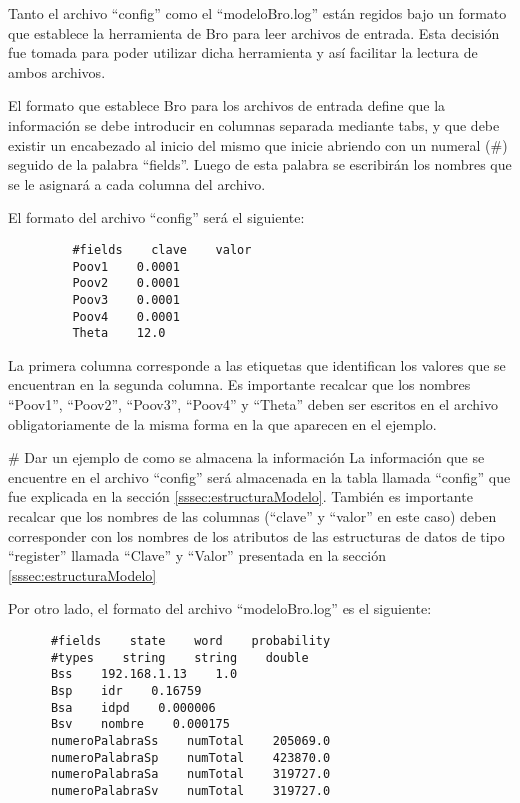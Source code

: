 Tanto el archivo “config” como el “modeloBro.log” están regidos bajo un formato que establece la herramienta de Bro para leer archivos de entrada. Esta decisión fue tomada para poder utilizar dicha herramienta y así facilitar la lectura de ambos archivos.

El formato que establece Bro para los archivos de entrada define que la información se debe introducir en columnas separada mediante tabs, y que debe existir un encabezado al inicio del mismo que inicie abriendo con un numeral (\#) seguido de la palabra “fields”. Luego de esta palabra se escribirán los nombres que se le asignará a cada columna del archivo.

El formato del archivo “config” será el siguiente:

\begin{verbatim}
         #fields    clave    valor
         Poov1    0.0001
         Poov2    0.0001
         Poov3    0.0001
         Poov4    0.0001
         Theta    12.0
\end{verbatim}

La primera columna corresponde a las etiquetas que identifican los valores que se encuentran en la segunda columna. Es importante recalcar que los nombres “Poov1”, “Poov2”, “Poov3”, “Poov4” y “Theta” deben ser escritos en el archivo obligatoriamente de la misma forma en la que aparecen en el ejemplo.

\# Dar un ejemplo de como se almacena la información
La información que se encuentre en el archivo “config” será almacenada en  la tabla llamada “config” que fue explicada en la sección \ref{sssec:estructuraModelo}. También es importante recalcar que los nombres de las columnas (“clave” y “valor” en este caso) deben corresponder con los nombres de los atributos de las estructuras de datos de tipo “register” llamada “Clave” y “Valor” presentada en la sección \ref{sssec:estructuraModelo}

Por otro lado, el formato del archivo “modeloBro.log” es el siguiente:

\begin{verbatim}
      #fields    state    word    probability
      #types    string    string    double
      Bss    192.168.1.13    1.0
      Bsp    idr    0.16759
      Bsa    idpd    0.000006
      Bsv    nombre    0.000175
      numeroPalabraSs    numTotal    205069.0
      numeroPalabraSp    numTotal    423870.0
      numeroPalabraSa    numTotal    319727.0
      numeroPalabraSv    numTotal    319727.0
\end{verbatim}

